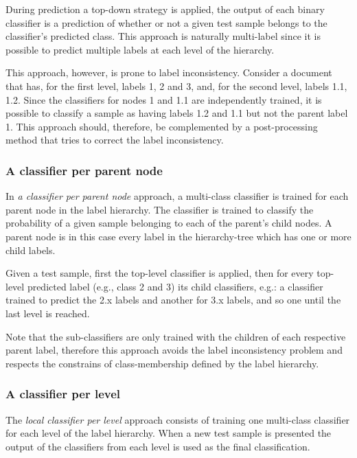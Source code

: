 \documentclass[11pt,a4paper]{article}
\begin{document}
During prediction a top-down strategy is applied, the output of each binary classifier is a
prediction of whether or not a given test sample belongs to the classifier’s predicted class. This
approach is naturally multi-label since it is possible to predict multiple labels at each level of the hierarchy.

This approach, however, is prone to label inconsistency. Consider a document that has, for the first level,
labels 1, 2 and 3, and, for the second level, labels 1.1, 1.2. Since the
classifiers for nodes 1 and 1.1 are independently trained, it is possible to classify a sample as having labels
1.2 and 1.1 but not the parent label 1. This approach should, therefore, be complemented by
a post-processing method that tries to correct the label inconsistency.


\subsubsection{A classifier per parent node} %
In \textit{a classifier per parent node} approach, a multi-class classifier is trained for each parent node in the label hierarchy.
The classifier is trained to classify the probability of a given sample belonging to each of the parent's
child nodes. A parent node is in this case every label in the hierarchy-tree which has one or more
child labels.

Given a test sample, first the top-level classifier is applied, then for every top-level
predicted label (e.g., class 2 and 3) its child classifiers, e.g.: a classifier
trained to predict the 2.x labels and another for 3.x labels, and so one until the last level is reached.

Note that the sub-classifiers are only trained with the children of each respective parent label, therefore
this approach avoids the label inconsistency problem and respects the constrains
of class-membership defined by the label hierarchy.


\subsubsection{A classifier per level} %
The \textit{local classifier per level} approach consists of training one multi-class classifier
for each level of the label hierarchy. When a new test sample is presented the output of the
classifiers from each level is used as the final classification.
\end{document}
